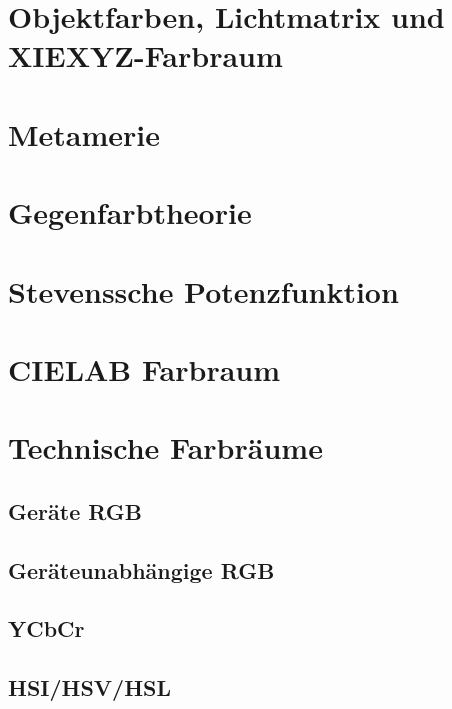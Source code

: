 \documentclass[a4paper, 11pt, accentcolor = tud3b]{tudreport}
\begin{document}
		\section{Objektfarben, Lichtmatrix und XIEXYZ-Farbraum} %

		\section{Metamerie} %

		\section{Gegenfarbtheorie} %

		\section{Stevenssche Potenzfunktion} %

		\section{CIELAB Farbraum} %

		\section{Technische Farbräume} %

			\subsection{Geräte RGB} %

			\subsection{Geräteunabhängige RGB} %

			\subsection{YCbCr} %

			\subsection{HSI/HSV/HSL} %
\end{document}

